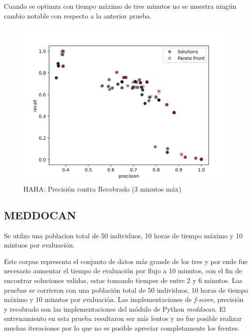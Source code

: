 Cuando se optimza con tiempo m\'aximo de tres minutos no se muestra ning\'un cambio notable con respecto a la anterior prueba. 

\begin{figure}[ht]
    \centering
    \includegraphics[scale=0.65]{Pictures/haha_precision_vs_recall_3min.jpg}
    \caption{HAHA: Precisi\'on contra Recobrado (3 minutos m\'ax)}
    \label{impl:fig:HAHA:precision_vs_recall}
\end{figure}

\subsection{MEDDOCAN}

Se utilzo una poblacion total de 50 individuos, 10 horas de tiempo m\'aximo y 10 mintuos por  evaluaci\'on. 

Este corpus representa el conjunto de datos m\'as grande de los tres y por ende fue necesario aumentar el tiempo de evaluaci\'on por flujo a 10 minutos, con el fin de encontrar soluciones validas, estas tomando tiempes de entre 2 y 6 minutos. Las pruebas se corrieron con una poblaci\'on total de 50 individuos, 10 horas de tiempo m\'aximo y 10 minutos por evaluaci\'on. 
Las implementaciones de \textit{f-score}, precisi\'on y recobrado son las implementaciones del m\'odulo de Python \textit{meddocan}.
El entrenamiento en esta prueba resultaron ser m\'as lentos y no fue posible realizar muchas iteraciones por lo que no es posible apreciar completamente los frentes.


